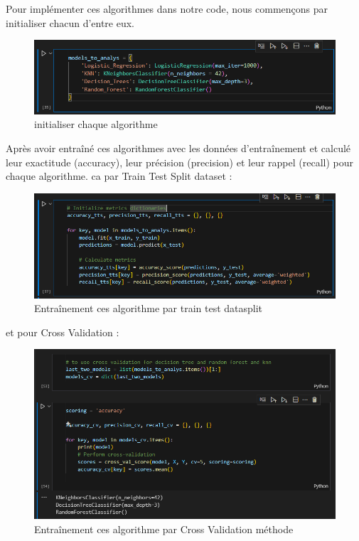 \documentclass[a4paper,12pt]{report}
\begin{document}
\noindent \normalsize Pour implémenter ces algorithmes dans notre code, nous commençons par initialiser chacun d'entre eux.
\begin{figure}[H]
\centering
 \includegraphics[scale=0.9]{outils-images/data16.png}
\caption{initialiser chaque algorithme}
\end{figure}
\noindent \normalsize Après avoir entraîné ces algorithmes avec les données d'entraînement et calculé leur exactitude (accuracy), leur précision (precision) et leur rappel (recall) pour chaque algorithme. 
ca par Train Test Split dataset :
\begin{figure}[H]
\centering
 \includegraphics[scale=0.9]{outils-images/data17.png}
\caption{Entraînement ces algorithme par train test datasplit}
\end{figure}
et pour Cross Validation :
\begin{figure}[H]
\centering
 \includegraphics[scale=0.9]{outils-images/data18.png}
\caption{Entraînement ces algorithme par Cross Validation méthode}
\end{figure}
\end{document}
